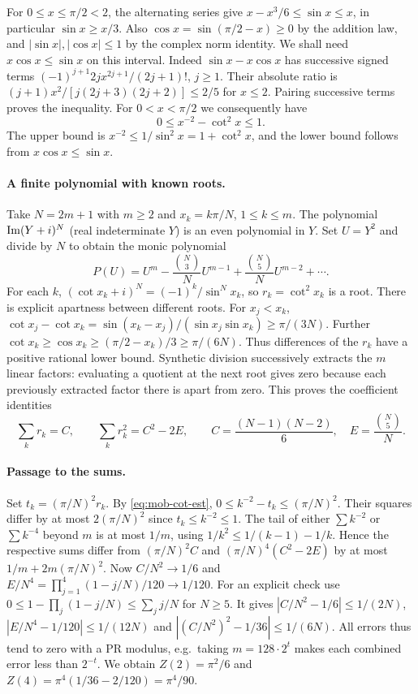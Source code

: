 For $0\le x\le\pi/2<2$, the alternating series give
$x-x^3/6\le\sin x\le x$, in particular $\sin x\ge x/3$.
Also $\cos x=\sin(\pi/2-x)\ge0$ by the addition law, and
$|\sin x|,|\cos x|\le1$ by the complex norm identity.
We shall need $x\cos x\le\sin x$ on this interval. Indeed
$\sin x-x\cos x$ has successive signed terms
$(-1)^{j+1}2j x^{2j+1}/(2j+1)!$, $j\ge1$. Their absolute ratio is
$(j+1)x^2/[j(2j+3)(2j+2)]\le 2/5$ for $x\le2$.
Pairing successive terms proves the inequality. For $0<x<\pi/2$
we consequently have
\begin{equation}
 0\le x^{-2}-\cot^2 x\le1 .\label{eq:mob-cot-est}
\end{equation}
The upper bound is $x^{-2}\le1/\sin^2x=1+\cot^2x$, and the lower
bound follows from $x\cos x\le\sin x$.

\paragraph{A finite polynomial with known roots.}
Take $N=2m+1$ with $m\ge2$ and $x_k=k\pi/N$, $1\le k\le m$.
The polynomial $\mathop{\rm Im}(Y+i)^N$ (real indeterminate $Y$)
is an even polynomial in $Y$. Set $U=Y^2$ and divide by $N$ to obtain
the monic polynomial
\[
 P(U)=U^m-\frac{\binom N3}{N}U^{m-1}
           +\frac{\binom N5}{N}U^{m-2}+\cdots .
\]
For each $k$, $(\cot x_k+i)^N=(-1)^k/\sin^N x_k$, so
$r_k=\cot^2x_k$ is a root. There is explicit apartness between
different roots. For $x_j<x_k$,
$\cot x_j-\cot x_k=\sin(x_k-x_j)/(\sin x_j\sin x_k)
\ge \pi/(3N)$.
Further $\cot x_k\ge \cos x_k\ge(\pi/2-x_k)/3\ge\pi/(6N)$.
Thus differences of the $r_k$ have a positive rational lower bound.
Synthetic division successively extracts the $m$ linear factors:
evaluating a quotient at the next root gives zero because each previously
extracted factor there is apart from zero. This proves the coefficient
identities
\[
 \sum_k r_k=C,\qquad \sum_k r_k^2=C^2-2E,\qquad
 C=\frac{(N-1)(N-2)}6,\quad E=\frac{\binom N5}{N}.
\]

\paragraph{Passage to the sums.}
Set $t_k=(\pi/N)^2r_k$. By \eqref{eq:mob-cot-est},
$0\le k^{-2}-t_k\le (\pi/N)^2$. Their squares differ by at most
$2(\pi/N)^2$ since $t_k\le k^{-2}\le1$.
The tail of either $\sum k^{-2}$ or $\sum k^{-4}$ beyond $m$ is
at most $1/m$, using
$1/k^2\le1/(k-1)-1/k$.
Hence the respective sums differ from $(\pi/N)^2 C$ and
$(\pi/N)^4(C^2-2E)$ by at most $1/m+2m(\pi/N)^2$.
Now $C/N^2\to1/6$ and
$E/N^4=\prod_{j=1}^4(1-j/N)/120\to1/120$.
For an explicit check use
$0\le1-\prod_j(1-j/N)\le\sum_j j/N$ for $N\ge5$.
It gives $|C/N^2-1/6|\le1/(2N)$,
$|E/N^4-1/120|\le1/(12N)$ and
$|(C/N^2)^2-1/36|\le1/(6N)$.
All errors thus tend to zero with a PR modulus, e.g.\ taking
$m=128\cdot2^t$ makes each combined error less than $2^{-t}$.
We obtain $Z(2)=\pi^2/6$ and
$Z(4)=\pi^4(1/36-2/120)=\pi^4/90$.


